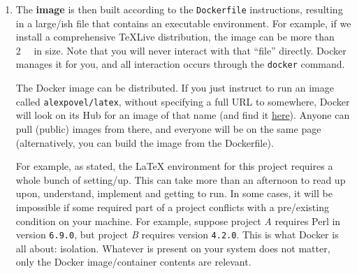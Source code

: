 \begin{enumerate}
        The Dockerfile this project uses for LaTeX stuff is here:
        \begin{center}
            \url{https://github.com/alexpovel/latex-extras-docker/blob/master/Dockerfile}
        \end{center}
        It is not as simple, so not as suited for an example.
        Its length gives you an idea of the setup required to compile this \LaTeX{} document.
        All of that complexity is of no concern to you when using Docker!
        Of course, such an image also works for much simpler documents.

        If you require custom additions, you can always inherit from existing base images:
        \begin{verbatim}
            FROM alexpovel/latex

            # ... Your stuff goes here ...
        \end{verbatim}
    \item The \textbf{image} is then built according to the \texttt{Dockerfile} instructions,
        resulting in a large\-/ish file that contains an executable environment.
        For example, if we install a comprehensive TeXLive distribution, the image can be
        more than \SI{2}{\giga\byte} in size.
        Note that you will never interact with that \enquote{file} directly.
        Docker manages it for you, and all interaction occurs through the \texttt{docker} command.

        The Docker image can be distributed.
        If you just instruct to run an image called  \texttt{alexpovel/latex}, without
        specifying a full URL to somewhere, Docker will look on its Hub for an image of that
        name (and find it \href{https://hub.docker.com/r/alexpovel/latex}{here}).
        Anyone can pull (public) images from there, and everyone will
        be on the same page (alternatively, you can build the image from the Dockerfile).

        For example, as stated, the \LaTeX{} environment for this project requires a whole bunch of setting\-/up.
        This can take more than an afternoon to read up upon, understand, implement and getting to run.
        In some cases, it will be impossible if some required part of a project conflicts
        with a pre\-/existing condition on your machine.
        For example, suppose project \emph{A} requires Perl in version \texttt{6.9.0},
        but project \emph{B} requires version \texttt{4.2.0}.
        This is what Docker is all about: isolation.
        Whatever is present on your system does not matter, only the Docker image/container
        contents are relevant.


\end{enumerate}
